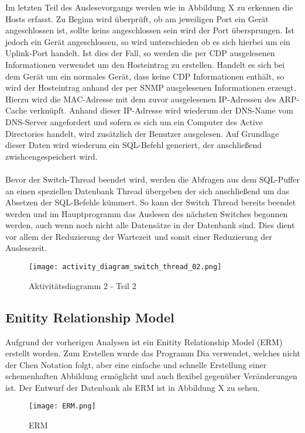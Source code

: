 Im letzten Teil des Auslesevorgangs werden wie in Abbildung X zu erkennen die Hosts erfasst.
Zu Beginn wird überprüft, ob am jeweiligen Port ein Gerät angeschlossen ist, sollte keins angeschlossen sein wird der Port übersprungen. Ist jedoch ein Gerät angeschlossen, so wird unterschieden ob es sich hierbei um ein Uplink-Port handelt. Ist dies der Fall, so werden die per CDP ausgelesenen Informationen verwendet um den Hosteintrag zu erstellen.
Handelt es sich bei dem Gerät um ein normales Gerät, dass keine CDP Informationen enthält, so wird der Hosteintrag anhand der per SNMP ausgelesenen Informationen erzeugt.
Hierzu wird die MAC-Adresse mit dem zuvor ausgelesenen IP-Adressen des ARP-Cache verknüpft. Anhand dieser IP-Adresse wird wiederum der DNS-Name vom DNS-Server angefordert und sofern es sich um ein Computer des Active Directories handelt, wird zusätzlich der Benutzer ausgelesen.
Auf Grundlage dieser Daten wird wiederum ein SQL-Befehl generiert, der anschließend zwishcengespeichert wird.\\\\
Bevor der Switch-Thread beendet wird, werden die Abfragen aus dem SQL-Puffer an einen speziellen Datenbank Thread übergeben der sich anschließend um das Absetzen der SQL-Befehle kümmert. So kann der Switch Thread bereits beendet werden und im Hauptprogramm das Auslesen des nächsten Switches begonnen werden, auch wenn noch nicht alle Datensätze in der Datenbank sind. Dies dient vor allem der Reduzierung der Wartezeit und somit einer Reduzierung der Auslesezeit.

\begin{figure}[H]
\centering
\texttt{[image: activity\_diagram\_switch\_thread\_02.png]}
\caption{Aktivitätsdiagramm 2 - Teil 2}
\label{fig:activitydiagram22}
\end{figure}

\subsection{Enitity Relationship Model}
\label{subsec:erm-diagram}

Aufgrund der vorherigen Analysen ist ein Enitity Relationship Model (ERM) erstellt
worden. Zum Erstellen wurde das Programm Dia verwendet, welches nicht der Chen
Notation folgt, aber eine einfache und schnelle Erstellung einer schemenhaften Abbildung ermöglicht und auch flexibel gegenüber Veränderungen ist.
Der Entwurf der Datenbank als ERM ist in Abbildung X zu sehen.

\begin{figure}[H]
\centering
\texttt{[image: ERM.png]}
\caption{ERM}
\label{fig:erm}
\end{figure}

